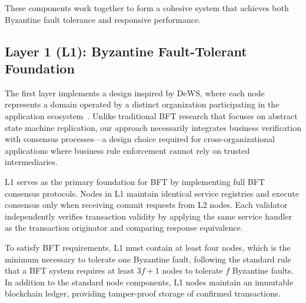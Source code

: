 \documentclass[conference]{IEEEtran}
\begin{document}
These components work together to form a cohesive system that achieves both Byzantine fault tolerance and responsive performance.

\subsection{Layer 1 (L1): Byzantine Fault-Tolerant Foundation}

The first layer implements a design inspired by DeWS, where each node represents a domain operated by a distinct organization participating in the application ecosystem~\cite{ramachandran_dews_2023}. Unlike traditional BFT research that focuses on abstract state machine replication, our approach necessarily integrates business verification with consensus processes—a design choice required for cross-organizational applications where business rule enforcement cannot rely on trusted intermediaries.

L1 serves as the primary foundation for BFT by implementing full BFT consensus protocols. Nodes in L1 maintain identical service registries and execute consensus only when receiving commit requests from L2 nodes. Each validator independently verifies transaction validity by applying the same service handler as the transaction originator and comparing response equivalence.

To satisfy BFT requirements, L1 must contain at least four nodes, which is the minimum necessary to tolerate one Byzantine fault, following the standard rule that a BFT system requires at least $3f+1$ nodes to tolerate $f$ Byzantine faults. In addition to the standard node components, L1 nodes maintain an immutable blockchain ledger, providing tamper-proof storage of confirmed transactions.
\end{document}
